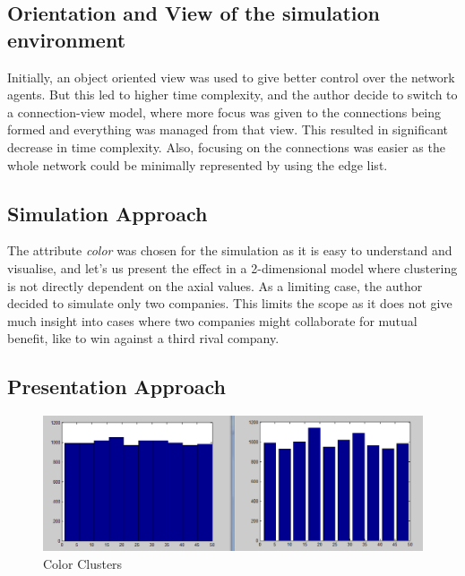 \subsection{Orientation and View of the simulation environment}

Initially, an object oriented view was used to give better control over the network agents. But this led to higher time complexity, and the author decide to switch to a connection-view model, where more focus was given to the connections being formed and everything was managed from that view. This resulted in significant decrease in time complexity.
Also, focusing on the connections was easier as the whole network could be minimally represented by using the edge list.



\subsection{Simulation Approach}

The attribute \emph{color} was chosen for the simulation as it is easy to understand and visualise, and let's us present the effect in a 2-dimensional model where clustering is not directly dependent on the axial values. 
As a limiting case, the author decided to simulate only two companies. This limits the scope as it does not give much insight into cases where two companies might collaborate for mutual benefit, like to win against a third rival company.


\subsection{Presentation Approach}

\begin{figure}
\includegraphics[scale=0.5]{Figures/10000_4_m1_100000}
\caption{Color Clusters}
\label{fig:color_clusters}
\end{figure}


